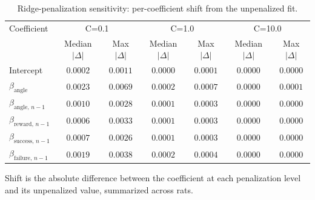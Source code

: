 \begin{table}[htbp]
\centering
\caption{Ridge-penalization sensitivity: per-coefficient shift from the unpenalized fit.}
\label{tab:glm-coef-shift-summary}
\begin{tabular}{lcccccc}
\toprule
Coefficient & \multicolumn{2}{c}{C=0.1} & \multicolumn{2}{c}{C=1.0} & \multicolumn{2}{c}{C=10.0} \\
 & Median $|\Delta|$ & Max $|\Delta|$ & Median $|\Delta|$ & Max $|\Delta|$ & Median $|\Delta|$ & Max $|\Delta|$ \\
\midrule
Intercept & $0.0002$ & $0.0011$ & $0.0000$ & $0.0001$ & $0.0000$ & $0.0000$ \\
$\beta_{\mathrm{angle}}$ & $0.0023$ & $0.0069$ & $0.0002$ & $0.0007$ & $0.0000$ & $0.0001$ \\
$\beta_{\mathrm{angle},\,n-1}$ & $0.0010$ & $0.0028$ & $0.0001$ & $0.0003$ & $0.0000$ & $0.0000$ \\
$\beta_{\mathrm{reward},\,n-1}$ & $0.0006$ & $0.0033$ & $0.0001$ & $0.0003$ & $0.0000$ & $0.0000$ \\
$\beta_{\mathrm{success},\,n-1}$ & $0.0007$ & $0.0026$ & $0.0001$ & $0.0003$ & $0.0000$ & $0.0000$ \\
$\beta_{\mathrm{failure},\,n-1}$ & $0.0019$ & $0.0038$ & $0.0002$ & $0.0004$ & $0.0000$ & $0.0000$ \\
\bottomrule
\end{tabular}
\vspace{4pt}
\par\noindent
\begin{minipage}{\linewidth}\small Shift is the absolute difference between the coefficient at each penalization level and its unpenalized value, summarized across rats.\end{minipage}
\end{table}